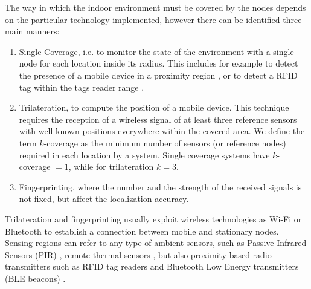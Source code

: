 The way in which the indoor environment must be covered by the nodes depends on the particular technology implemented, however there can be identified three main manners: 
\begin{enumerate}[label={(\arabic*)}]
\item Single Coverage, i.e. to monitor the state of the environment with a single node for each location inside its radius. This includes for example to detect the presence of a mobile device in a proximity region \cite{Andersson2014}, or to detect a RFID tag within the tags reader range \cite{Paul2014}.
\item Trilateration, to compute the position of a mobile device. This technique requires the reception of a wireless signal of at least three reference sensors with well-known positions everywhere within the covered area. We define the term \mbox{$k$-coverage} as the minimum number of sensors (or reference nodes) required in each location by a system. Single coverage systems have \mbox{$k$-coverage} $ = 1$, while for trilateration $k=3$.
\item Fingerprinting, where the number and the strength of the received signals is not fixed, but affect the localization accuracy.
\end{enumerate}
Trilateration and fingerprinting usually exploit wireless technologies as Wi-Fi or Bluetooth to establish a connection between mobile and stationary nodes. Sensing regions can refer to any type of ambient sensors, such as Passive Infrared Sensors (PIR) \cite{Erickson2013}, remote thermal sensors \cite{Beltran2013}, but also proximity based radio transmitters such as RFID tag readers \cite{Zhao2014} and Bluetooth Low Energy transmitters (BLE beacons) \cite{Nacci2015}.
